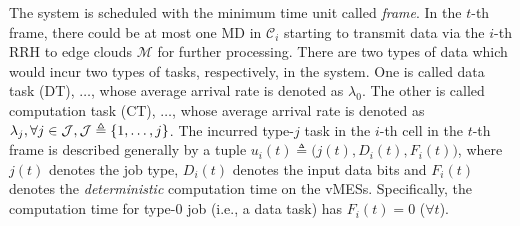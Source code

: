 \documentclass[journal, 12pt, onecolumn, draftclsnofoot]{IEEEtran}
\newcommand{\define}{\triangleq}
\DeclarePairedDelimiter{\set}{\{}{\}}
\begin{document}
The system is scheduled with the minimum time unit called \emph{frame}.
In the $t$-th frame, there could be at most one MD in $\mathcal{C}_{i}$ starting to transmit data via the $i$-th RRH to edge clouds $\mathcal{M}$ for further processing.
There are two types of data which would incur two types of tasks, respectively, in the system.
One is called data task (DT), $\dots$, whose average arrival rate is denoted as $\lambda_{0}$.
The other is called computation task (CT), $\dots$, whose average arrival rate is denoted as $\lambda_{j}, \forall j\in\mathcal{J}, \mathcal{J} \define \set{1,\dots,j}$. 
The incurred type-$j$ task in the $i$-th cell in the $t$-th frame is described generally by a tuple $u_{i}(t) \define \big( j(t), D_{i}(t), F_{i}(t) \big)$, where $j(t)$ denotes the job type, $D_{i}(t)$ denotes the input data bits and $F_{i}(t)$ denotes the \emph{deterministic} computation time on the vMESs.
Specifically, the computation time for type-$0$ job (i.e., a data task) has $F_{i}(t)=0$ ($\forall t$).
\end{document}
